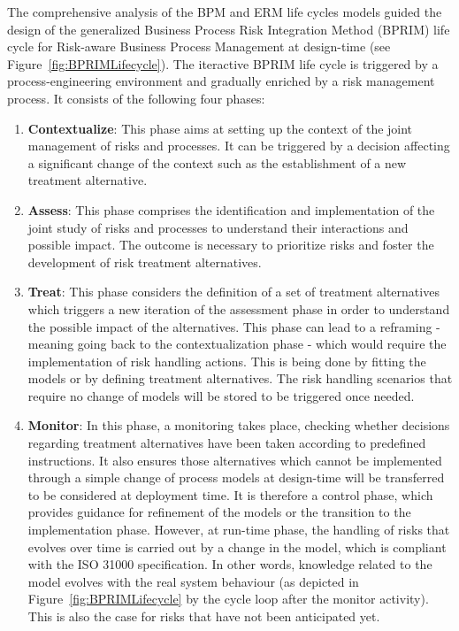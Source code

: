 \documentclass[preprint,3p,times,number]{elsarticle}
\begin{document}
The comprehensive analysis of the BPM and ERM life cycles models guided the design of the generalized Business Process Risk Integration Method (BPRIM) life cycle for Risk-aware Business Process Management at design-time (see Figure~\ref{fig:BPRIMLifecycle}). The iteractive BPRIM life cycle is triggered by a process-engineering environment and gradually enriched by a risk management process. It consists of the following four phases:
 \begin{enumerate}
     \item \textbf{Contextualize}: This phase aims at setting up the context of the joint management of risks and processes. It can be triggered by a decision affecting a significant change of the context such as the establishment of a new treatment alternative.
     \item \textbf{Assess}: This phase comprises the identification and implementation of the joint study of risks and processes to understand their interactions and possible impact. The outcome is necessary to prioritize risks and foster the development of risk treatment alternatives.
     \item \textbf{Treat}: This phase considers the definition of a set of treatment alternatives which triggers a new iteration of the assessment phase in order to understand the possible impact of the alternatives. This phase can lead to a reframing - meaning going back to the contextualization phase - which would require the implementation of risk handling actions. This is being done by fitting the models or by defining treatment alternatives. The risk handling scenarios that require no change of models will be stored to be triggered once needed.
     \item \textbf{Monitor}: In this phase, a monitoring takes place, checking whether decisions regarding treatment alternatives have been taken according to predefined instructions. It also ensures those alternatives which cannot be implemented through a simple change of process models at design-time will be transferred to be considered at deployment time. It is therefore a control phase, which provides guidance for refinement of the models or the transition to the implementation phase. However, at run-time phase, the handling of risks that evolves over time is carried out by a change in the model, which is compliant with the ISO 31000 specification. In other words, knowledge related to the model evolves with the real system behaviour (as depicted in Figure~\ref{fig:BPRIMLifecycle} by the cycle loop after the monitor activity). This is also the case for risks that have not been anticipated yet.
 \end{enumerate}
  
\end{document}
